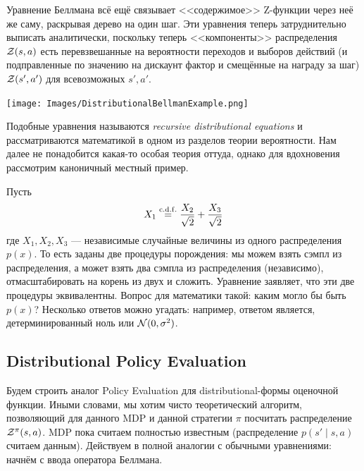 \begin{exampleBox}[righthand ratio=0.55, sidebyside, sidebyside align=center, lower separated=false]{}
Уравнение Беллмана всё ещё связывает <<содержимое>> Z-функции через неё же саму, раскрывая дерево на один шаг. Эти уравнения теперь затруднительно выписать аналитически, поскольку теперь <<компоненты>> распределения $\mathcal{Z}(s, a)$ есть перевзвешанные на вероятности переходов и выборов действий (и подправленные по значению на дискаунт фактор и смещённые на награду за шаг) $\mathcal{Z}(s', a')$ для всевозможных $s', a'$.

\tcblower
\begin{adjustwidth}{-0.85cm}{}
\texttt{[image: Images/DistributionalBellmanExample.png]}
\end{adjustwidth}
\end{exampleBox}

Подобные уравнения называются \emph{recursive distributional equations} и рассматриваются математикой в одном из разделов теории вероятности. Нам далее не понадобится какая-то особая теория оттуда, однако для вдохновения рассмотрим каноничный местный пример. 
\begin{example}
Пусть
$$X_1 \mathrel{\stackrel{\mathrm{c.d.f.}}=} \frac{X_2}{\sqrt{2}} + \frac{X_3}{\sqrt{2}}$$
где $X_1, X_2, X_3$ --- независимые случайные величины из одного распределения $p(x)$. То есть заданы две процедуры порождения: мы можем взять сэмпл из распределения, а может взять два сэмпла из распределения (независимо), отмасштабировать на корень из двух и сложить. Уравнение заявляет, что эти две процедуры эквивалентны. Вопрос для математики такой: каким могло бы быть $p(x)$? Несколько ответов можно угадать: например, ответом является, детерминированный ноль или $\mathcal{N}(0, \sigma^2)$.
\end{example}

\subsection{Distributional Policy Evaluation}

Будем строить аналог Policy Evaluation для distributional-формы оценочной функции. Иными словами, мы хотим чисто теоретический алгоритм, позволяющий для данного MDP и данной стратегии $\pi$ посчитать распределение $\mathcal{Z}^\pi(s, a)$. MDP пока считаем полностью известным (распределение $p(s' \mid s, a)$ считаем данным). Действуем в полной аналогии с обычными уравнениями: начнём с ввода оператора Беллмана.

